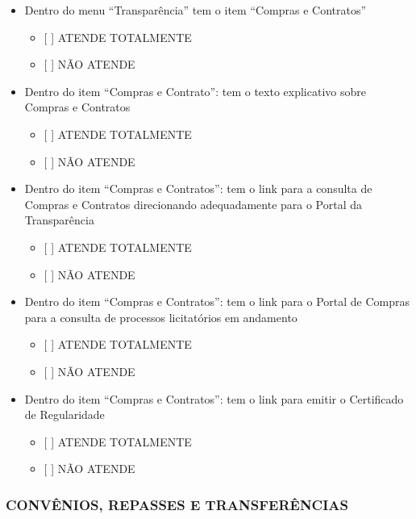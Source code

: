 \documentclass[]{book}
\providecommand{\tightlist}{%
  \setlength{\itemsep}{0pt}\setlength{\parskip}{0pt}}
\begin{document}
\begin{itemize}
\tightlist
\item
  Dentro do menu ``Transparência'' tem o item ``Compras e Contratos''

  \begin{itemize}
  \tightlist
  \item
    {[} {]} ATENDE TOTALMENTE
  \item
    {[} {]} NÃO ATENDE
  \end{itemize}
\item
  Dentro do item ``Compras e Contrato'': tem o texto explicativo sobre Compras e Contratos

  \begin{itemize}
  \tightlist
  \item
    {[} {]} ATENDE TOTALMENTE
  \item
    {[} {]} NÃO ATENDE
  \end{itemize}
\item
  Dentro do item ``Compras e Contratos'': tem o link para a consulta de Compras e Contratos direcionando adequadamente para o Portal da Transparência

  \begin{itemize}
  \tightlist
  \item
    {[} {]} ATENDE TOTALMENTE
  \item
    {[} {]} NÃO ATENDE
  \end{itemize}
\item
  Dentro do item ``Compras e Contratos'': tem o link para o Portal de Compras para a consulta de processos licitatórios em andamento

  \begin{itemize}
  \tightlist
  \item
    {[} {]} ATENDE TOTALMENTE
  \item
    {[} {]} NÃO ATENDE
  \end{itemize}
\item
  Dentro do item ``Compras e Contratos'': tem o link para emitir o Certificado de Regularidade

  \begin{itemize}
  \tightlist
  \item
    {[} {]} ATENDE TOTALMENTE
  \item
    {[} {]} NÃO ATENDE
  \end{itemize}
\end{itemize}

\hypertarget{convuxeanios-repasses-e-transferuxeancias-1}{%
\subsubsection*{CONVÊNIOS, REPASSES E TRANSFERÊNCIAS}\label{convuxeanios-repasses-e-transferuxeancias-1}}
\end{document}
